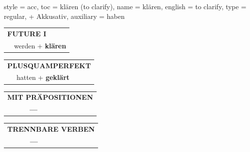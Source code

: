 \begin{verbentry}{
  style = {acc},
  toc = {klären (to clarify)},
  name = {klären},
  english = {to clarify},
  type = {regular, + Akkusativ},
  auxiliary = {haben}
}
\begin{tabular}{rl}
    \multicolumn{2}{l}{\textbf{FUTURE I} }\\
   & werden + \textbf{klären}\\
 
  \end{tabular}
\hfill
   \begin{tabular}{rl}
      \multicolumn{2}{l}{\textbf{PLUSQUAMPERFEKT}}\\
   & hatten + \textbf{geklärt}\\
  \end{tabular}
  
  
\vspace{10pt}

\begin{tabular}{lll}
\multicolumn{3}{l}{\textbf{MIT PRÄPOSITIONEN}}\\
& \textbf{---} & \\
\end{tabular}
\hfill
\begin{tabular}{lll}
\multicolumn{3}{l}{\textbf{TRENNBARE VERBEN}}\\
& \textbf{---} & \\
\end{tabular}
\vspace{-5pt}
\end{verbentry}

